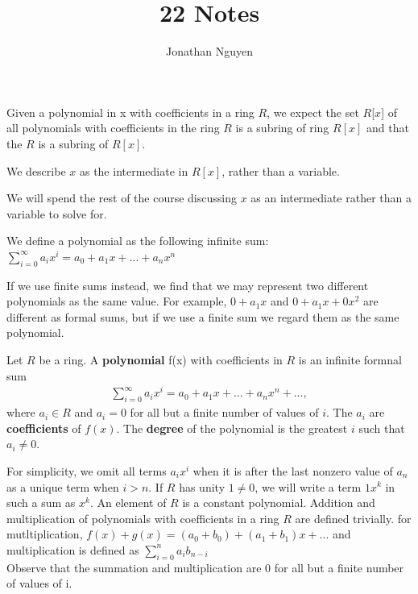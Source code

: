 \documentclass[11pt]{article}
\title{22 Notes}
\author{Jonathan Nguyen}
\date{}
\begin{document}
\maketitle
Given a polynomial in x with coefficients in a ring $R$, we expect the set $R$[$x$] of all polynomials with coefficients in the ring $R$  is a subring of ring $R[x]$ 
and that the $R$ is a subring of $R[x]$.

\begin{definition}[Intermediate]
    We describe $x$ as the intermediate in $R[x]$, rather than a variable.
\end{definition}
We will spend the rest of the course discussing $x$ as an intermediate rather than a variable to solve for.


\begin{definition}[Polynomial]
    We define a polynomial as the following infinite sum: $\sum_{i = 0}^{\infty}a_ix^i = a_0 + a_1x + ... + a_nx^n$
\end{definition}
If we use finite sums instead, we find that we may represent two different polynomials as the same value. For example, $0 + a_1x$ and $0 + a_1x + 0x^2$ are different as formal sums, but if we use a finite sum we regard them as the same polynomial.

\begin{definition}[22.1]
    Let $R$ be a ring. A \textbf{polynomial} f(x) with coefficients in $R$ is an infinite formnal sum 
    \begin{align*}
        \sum_{i = 0}^{\infty}a_ix^i = a_0 + a_1x + ... + a_nx^n +...,
    \end{align*}
    where $a_i \in R$ and $a_i = 0$ for all but a finite number of values of $i$. The $a_i$ are \textbf{coefficients} of $f(x)$.
    The \textbf{degree} of the polynomial is the greatest $i$ such that $a_i \neq 0$.
\end{definition}

For simplicity, we omit all terms $a_ix^i$ when it is after the last nonzero value of $a_n$ as a unique term when $i>n$. 
If $R$ has unity $1 \neq 0$, we will write a term $1x^k$ in such a sum as $x^k$. 
An element of $R$ is a constant polynomial. Addition and multiplication of polynomials with coefficients in a ring $R$ are defined trivially. 
for mutltiplication, $f(x) + g(x) = (a_0 + b_0) + (a_1 + b_1)x + ... $ and multiplication is defined as $\sum_{i = 0}^{n}a_ib_{n - i}$\\
Observe that the summation and multiplication are 0 for all but a finite number of values of i.
\end{document}
